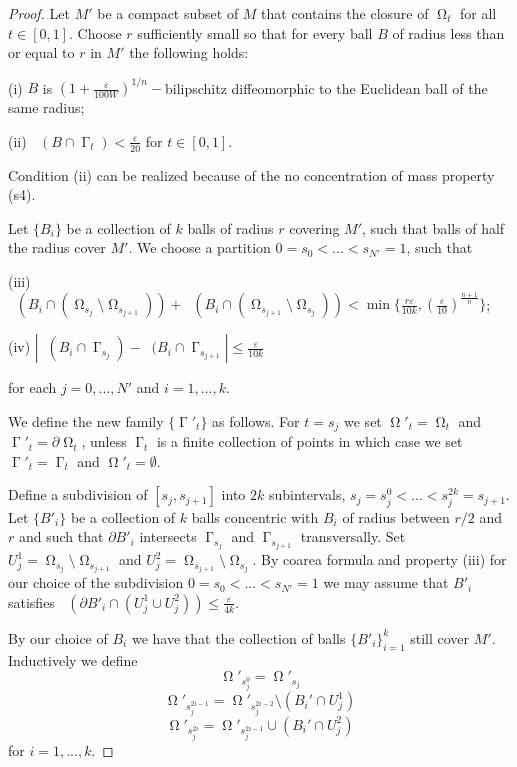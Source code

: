\documentclass[12pt]{amsart}
\DeclareMathOperator{\Hn}{\mathcal{H}^n}
\DeclareMathOperator{\Hnn}{\mathcal{H}^{n+1}}
\DeclareMathOperator{\G}{\Gamma}
\DeclareMathOperator{\Om}{\Omega}
\theoremstyle{definition}
\begin{document}
\begin{proof}
Let $M'$ be a compact subset of $M$
that contains the closure of $\Om_t$ for all $t \in [0,1]$.
Choose $r$ sufficiently small 
so that for 
 every ball $B$ of radius less than or equal to $r$ in $M'$ the following holds:

(i) $B$
is $(1+\frac{\varepsilon}{100W})^{1/n}-$bilipschitz diffeomorphic
to the Euclidean ball of the same radius;

(ii) $\Hn(B \cap \G_t) < \frac{\varepsilon}{20}$ for $t \in [0,1]$.

Condition (ii) can be realized because of the no concentration of 
mass property (s4).

Let $\{B_i\}$ be a collection of $k$ balls of radius $r$ covering
$M'$, such that balls of half the radius cover $M'$. We choose a partition 
$0=s_0< ... < s_{N'}=1$, such that 


(iii) $\Hnn(B_i \cap (\Om_{s_j} \setminus \Om_{s_{j+1}})) + 
\Hnn(B_i \cap (\Om_{s_{j+1}} \setminus \Om_{s_j})) < 
\min \{ \frac{r \varepsilon}{10k}, (\frac{\varepsilon}{10}) ^{\frac{n+1}{n}} \}$;

(iv) $|\Hn(B_i  \cap \G_{s_j}) - \Hn(B_i \cap \G_{s_{j+1}}| \leq \frac{\varepsilon}{10k}$

for each $j=0,...,N'$ and $i=1,...,k$.

We define the new family $\{\G'_t\}$ as follows.
For $t=s_j$ we set $\Om'_t = \Om_t$
and $\G'_t = \partial \Om_t$, unless $\G_t$ is a finite collection
of points in which case we set $\G'_t = \G_t$ and $\Om'_t = \emptyset$.

Define a subdivision of $[s_j, s_{j+1}]$ into $2k$ subintervals,
$s_j=s_j^0<...<s_j^{2k}=s_{j+1}$.
Let $\{B'_i\}$ be a collection of $k$ balls concentric with
$B_i$ of radius between $r/2$ and $r$ and such that
$\partial B'_i$ intersects $\G_{s_j}$ and $\G_{s_{j+1}}$
transversally. Set $U_j^1 = \Om_{s_j} \setminus \Om_{s_{j+1}}$
and $U_j^2 = \Om_{s_{j+1}} \setminus \Om_{s_j}$.
By coarea formula and property (iii)
for our choice of the subdivision $0=s_0< ... < s_{N'}=1$
we may assume that $B'_i$ satisfies
$\Hn(\partial B'_i \cap (U_j^1 \cup U_j^2)) \leq \frac{\varepsilon}{4k}$. 

By our choice of $B_i$ we have
that the collection of balls $\{B'_i\}_{i=1}^k$ still cover $M'$.
Inductively we define 
$$\Om'_{s_j ^{0}} = \Om'_{s_j}$$
$$\Om'_{s_j ^{2i-1}} = \Om'_{s_j ^{2i-2}} \setminus (B_i' \cap U_j^1)$$
$$\Om'_{s_j ^{2i}} = \Om'_{s_j ^{2i-1}} \cup (B_i' \cap U_j^2)$$ 
for $i=1,...,k$.



\end{proof}
\end{document}
